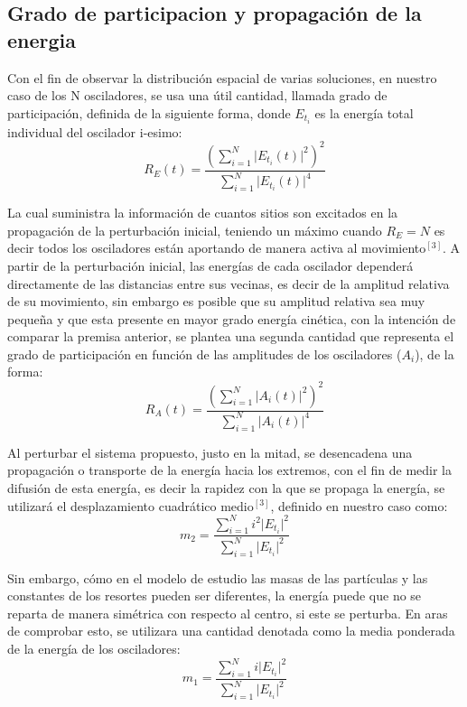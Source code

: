 \documentclass[11pt,letterpaper,twocolumn]{article}
\begin{document}
\subsection*{Grado de participacion y propagación de la energia}
Con el fin de observar la distribución espacial de varias soluciones, en nuestro caso de los N osciladores, se usa una útil cantidad, llamada grado de participación, definida de la siguiente forma, donde $E_{t_{i}}$ es la energía total individual del oscilador i-esimo: 
\begin{equation}
R_{E}(t)=\dfrac{\left( \sum_{i=1}^{N}\lvert E_{t_{i}}(t) \rvert^{2} \right)^{2}}{\sum_{i=1}^{N}\lvert E_{t_{i}}(t) \rvert^{4}} 
\end{equation}
\par 
La cual suministra la información de cuantos sitios son excitados en la propagación de la perturbación inicial, teniendo un máximo cuando $R_{E}=N$ es decir todos los osciladores están aportando de manera activa al movimiento$^{[3]}$. A partir de la perturbación inicial, las energías de cada oscilador dependerá directamente de las distancias entre sus vecinas, es decir de la amplitud relativa de su movimiento, sin embargo es posible que su amplitud relativa sea muy pequeña y que esta presente en mayor grado energía cinética, con la intención de comparar la premisa anterior, se plantea una segunda cantidad que representa el grado de participación en función de las amplitudes de los osciladores ($A_{i}$), de la forma: 
\begin{equation}
R_{A}(t)=\dfrac{\left( \sum_{i=1}^{N}\lvert A_{i}(t) \rvert^{2} \right)^{2}}{\sum_{i=1}^{N}\lvert A_{i}(t) \rvert^{4}} 
\end{equation}
\par 
Al perturbar el sistema propuesto, justo en la mitad, se desencadena una propagación o transporte de la energía hacia los extremos, con el fin de medir la difusión de esta energía, es decir la rapidez con la que se propaga la energía, se utilizará el desplazamiento cuadrático medio$^{[3]}$, definido en nuestro caso como: 
\begin{equation}
m_{2}=\dfrac{\sum_{i=1}^{N} i^{2} \lvert E_{t_{i}} \rvert^{2} }{\sum_{i=1}^{N} \lvert E_{t_{i}} \rvert^{2}}
\end{equation}
\par 
Sin embargo, cómo en el modelo de estudio las masas de las partículas y las constantes de los resortes pueden ser diferentes, la energía puede que no se reparta de manera simétrica con respecto al centro, si este se perturba. En aras de comprobar esto, se utilizara una cantidad denotada como la media ponderada de la energía de los osciladores: 
\begin{equation}
m_{1}=\dfrac{\sum_{i=1}^{N} i \lvert E_{t_{i}} \rvert^{2} }{\sum_{i=1}^{N} \lvert E_{t_{i}} \rvert^{2}}
\end{equation}
\end{document}
